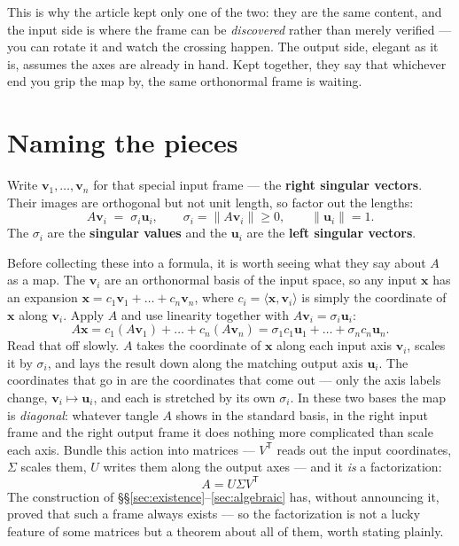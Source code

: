 \documentclass[11pt]{article}
\numberwithin{equation}{section}
\newcommand{\T}{^{\mathsf{T}}}
\newcommand{\ip}[2]{\langle #1, #2 \rangle}
\newcommand{\vv}[1]{\mathbf{v}_{#1}}
\newcommand{\uu}[1]{\mathbf{u}_{#1}}
\theoremstyle{plainish}
\begin{document}
\noindent
This is why the article kept only one of the two: they are the same content, and
the input side is where the frame can be \emph{discovered} rather than merely
verified --- you can rotate it and watch the crossing happen. The output side,
elegant as it is, assumes the axes are already in hand. Kept together, they say
that whichever end you grip the map by, the same orthonormal frame is waiting.

\section{Naming the pieces}
\label{sec:naming}

Write $\vv1, \dots, \vv n$ for that special input frame --- the \textbf{right
singular vectors}. Their images are orthogonal but not unit length, so
factor out the lengths:
\begin{equation}A \vv i \;=\; \sigma_i \uu i, \qquad \sigma_i = \|A\vv i\| \geq 0, \qquad \|\uu i\| = 1 .
\end{equation}
The $\sigma_i$ are the \textbf{singular values} and the $\uu i$ are the
\textbf{left singular vectors}.

Before collecting these into a formula, it is worth seeing what they say about
$A$ as a map. The $\vv i$ are an orthonormal basis of the input space, so any
input $\mathbf{x}$ has an expansion $\mathbf{x} = c_1 \vv1 + \dots + c_n \vv n$,
where $c_i = \ip{\mathbf{x}}{\vv i}$ is simply the coordinate of $\mathbf{x}$
along $\vv i$. Apply $A$ and use linearity together with $A\vv i = \sigma_i\uu i$:
\begin{equation}A\mathbf{x} = c_1 (A\vv1) + \dots + c_n (A\vv n)
  = \sigma_1 c_1 \uu1 + \dots + \sigma_n c_n \uu n .
\end{equation}
Read that off slowly. $A$ takes the coordinate of $\mathbf{x}$ along each input
axis $\vv i$, scales it by $\sigma_i$, and lays the result down along the
matching output axis $\uu i$. The coordinates that go in are the coordinates that
come out --- only the axis labels change, $\vv i \mapsto \uu i$, and each is
stretched by its own $\sigma_i$. In these two bases the map is \emph{diagonal}:
whatever tangle $A$ shows in the standard basis, in the right input frame and the
right output frame it does nothing more complicated than scale each axis. Bundle
this action into matrices --- $V\T$ reads out the input coordinates, $\Sigma$
scales them, $U$ writes them along the output axes --- and it \emph{is} a
factorization:
\begin{equation}\boxed{\; A = U \Sigma V\T \;}
\end{equation}
The construction of \S\S\ref{sec:existence}--\ref{sec:algebraic} has, without
announcing it, proved that such a frame always exists --- so the factorization is
not a lucky feature of some matrices but a theorem about all of them, worth
stating plainly.
\end{document}
